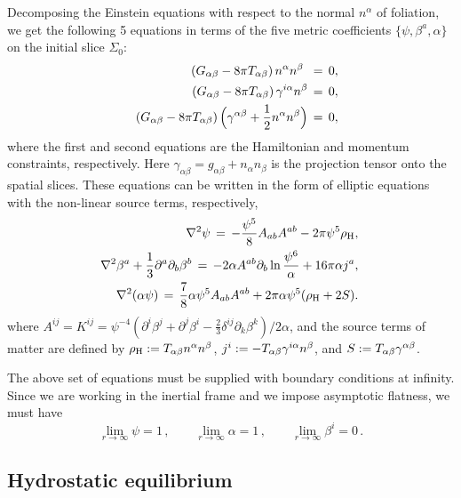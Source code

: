 \documentclass[twocolumn,superscriptaddress,showpacs,prd,aps,amsmath,amssymb,nofootinbib]{revtex4-1}
\begin{document}
Decomposing the Einstein equations with respect to the normal $n^\alpha$
of foliation, we get the following 5 equations in terms of the five
metric coefficients $\{\psi, \beta^a, \alpha\}$ on the initial slice
$\Sigma_0$: 
%
\begin{eqnarray} 
&&(G_{\alpha\beta}-8\pi T_{\alpha\beta})\,n^\alpha n^\beta \ \,=\, 0,
\label{eq:Ham}\\
&&(G_{\alpha\beta}-8\pi T_{\alpha\beta})\,\gamma^{i\alpha} n^\beta \,=\, 0,
\label{eq:Mom}\\
&&(G_{\alpha\beta}-8\pi T_{\alpha\beta})\,\Big(\gamma^{{\alpha\beta}}+\frac12 n^\alpha n^\beta\Big)
\,=\, 0, 
\label{eq:trG}
\end{eqnarray} 
%
where the first and second equations are the Hamiltonian and momentum
constraints, respectively. Here $\gamma_{\alpha\beta} =
g_{\alpha\beta}+n_\alpha n_\beta$ is the projection tensor onto the
spatial slices. These equations can be written in the form of elliptic
equations with the non-linear source terms, respectively,
\begin{eqnarray} 
&&
\!\!\!\!\!\!\!  \nabla^2\psi \,=\, - \frac{\psi^5}{8}A_{ab}A^{ab} -
2\pi\psi^5\rhoH,
\label{eq:HaC_elip2}   \\
&& \!\!\!\!\!\!\!
\nabla^2\beta^a + \frac13 \partial^a\partial_b\beta^b \,=\,
-2\alpha A^{ab}\partial_b\ln\frac{\psi^6}{\alpha} + 16\pi\alpha j^a,
\label{eq:MoC_elip2} \\
&& \!\!\!\!\!\!\!
\nabla^2(\alpha\psi) \,=\, \frac{7}{8}\alpha\psi^5A_{ab}A^{ab}
+ 2\pi\alpha\psi^5(\rhoH+2S).  \label{eq:trG_elip2}
\end{eqnarray}
%
where $A^{ij}=K^{ij}={\psi^{-4}}(\partial^i \beta^j + \partial^j\beta^i
-\frac{2}{3}\delta^{ij}\partial_k\beta^k)/{2\alpha}$, and the source
terms of matter are defined by $\rho_{\rm H}:=T_{\alpha\beta} n^\alpha n^\beta$,
$j^i:=-T_{\alpha\beta} \gamma^{i\alpha} n^\beta$, and $S:=T_{\alpha\beta} \gamma^{\alpha
  \beta}$.

The above set of equations must be supplied with 
boundary conditions at infinity. Since we are working
in the inertial frame and we impose asymptotic flatness, we must have
\begin{equation}
\lim_{r\rightarrow\infty} \psi = 1\,,\qquad 
\lim_{r\rightarrow\infty} \alpha = 1\,,\qquad 
\lim_{r\rightarrow\infty} \beta^i = 0\,.
\label{eq:bcpsal}
\end{equation}




\subsection{Hydrostatic equilibrium}
\label{sec:fluidformulation}
\end{document}
